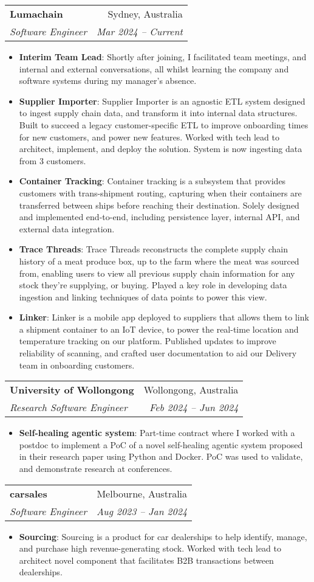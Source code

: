 \documentclass[letterpaper,11pt]{article}
\makeatletter
\newcommand{\resumeItem}[2]{
  \item\small{
    \textbf{#1}{: #2 \vspace{-2pt}}
  }
}
\newcommand{\resumeSubheading}[4]{
  \vspace{-1pt}\item
    \begin{tabular*}{0.97\textwidth}[t]{l@{\extracolsep{\fill}}r}
      \textbf{#1} & #2 \\
      \textit{\small#3} & \textit{\small #4} \\
    \end{tabular*}\vspace{-5pt}
}
\newcommand{\resumeItemListStart}{\begin{itemize}}
\newcommand{\resumeItemListEnd}{\end{itemize}\vspace{-5pt}}
\makeatother
\begin{document}
    \resumeSubheading
      {Lumachain}{Sydney, Australia}
      {Software Engineer}{Mar 2024 -- Current}
      \resumeItemListStart
        \resumeItem{Interim Team Lead}
          {Shortly after joining, I facilitated team meetings, and internal and external conversations, all whilst learning the company and software systems during my manager's absence.}
        \resumeItem{Supplier Importer}
          {Supplier Importer is an agnostic ETL system designed to ingest supply chain data, and transform it into internal data structures. Built to succeed a legacy customer-specific ETL to improve onboarding times for new customers, and power new features. Worked with tech lead to architect, implement, and deploy the solution. System is now ingesting data from 3 customers.}
        \resumeItem{Container Tracking}
          {Container tracking is a subsystem that provides customers with trans-shipment routing, capturing when their containers are transferred between ships before reaching their destination. Solely designed and implemented end-to-end, including persistence layer, internal API, and external data integration.}
        \resumeItem{Trace Threads}
          {Trace Threads reconstructs the complete supply chain history of a meat produce box, up to the farm where the meat was sourced from, enabling users to view all previous supply chain information for any stock they're supplying, or buying. Played a key role in developing data ingestion and linking techniques of data points to power this view.}
        \resumeItem{Linker}
          {Linker is a mobile app deployed to suppliers that allows them to link a shipment container to an IoT device, to power the real-time location and temperature tracking on our platform. Published updates to improve reliability of scanning, and crafted user documentation to aid our Delivery team in onboarding customers. }
      \resumeItemListEnd

    \resumeSubheading
      {University of Wollongong}{Wollongong, Australia}
      {Research Software Engineer}{Feb 2024 -- Jun 2024}
      \resumeItemListStart
        \resumeItem{Self-healing agentic system}
          {Part-time contract where I worked with a postdoc to implement a PoC of a novel self-healing agentic system proposed in their research paper using Python and Docker. PoC was used to validate, and demonstrate research at conferences.}
      \resumeItemListEnd

    \resumeSubheading
      {carsales}{Melbourne, Australia}
      {Software Engineer}{Aug 2023 -- Jan 2024}
      \resumeItemListStart
        \resumeItem{Sourcing}
          {Sourcing is a product for car dealerships to help identify, manage, and purchase high revenue-generating stock. Worked with tech lead to architect novel component that facilitates B2B transactions between dealerships.}
      \resumeItemListEnd
      
\end{document}

